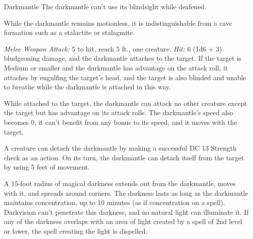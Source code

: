 \documentclass[10pt,a4paper,twoside,bg=print,twocolumn,openany,nodeprecatedcode]{dndbook}
\begin{document}
\begin{DndMonster}[float=t]{Darkmantle}
\DndMonsterBasics[
armor-class = {11},
hit-points = {\DndDice{5d6 + 5}},
speed = {10 ft., fly 30 ft.}
]
\DndMonsterAbilityScores[
 str = 16,
 dex = 12,
 con = 13,
 int = 2,
 wis = 10,
 cha = 5
]
\DndMonsterDetails[
skills = {Stealth +3},
senses = {blindsight 60 ft., passive perception 10},
challenge = 1/2,
]
The darkmantle can't use its blindsight while deafened.

While the darkmantle remains motionless, it is indistinguishable from a cave formation such as a stalactite or stalagmite.

\textsl{Melee Weapon Attack:} 5 to hit, reach 5 ft., one creature. \textsl{Hit:} 6 (1d6 + 3) bludgeoning damage, and the darkmantle attaches to the target. If the target is Medium or smaller and the darkmantle has advantage on the attack roll, it attaches by engulfing the target's head, and the target is also blinded and unable to breathe while the darkmantle is attached in this way.

While attached to the target, the darkmantle can attack no other creature except the target but has advantage on its attack rolls. The darkmantle's speed also becomes 0, it can't benefit from any bonus to its speed, and it moves with the target.

A creature can detach the darkmantle by making a successful DC 13 Strength check as an action. On its turn, the darkmantle can detach itself from the target by using 5 feet of movement.

A 15-foot radius of magical darkness extends out from the darkmantle, moves with it, and spreads around corners. The darkness lasts as long as the darkmantle maintains concentration, up to 10 minutes (as if concentration on a spell). Darkvision can't penetrate this darkness, and no natural light can illuminate it. If any of the darkness overlaps with an area of light created by a spell of 2nd level or lower, the spell creating the light is dispelled.

\end{DndMonster}
\end{document}
